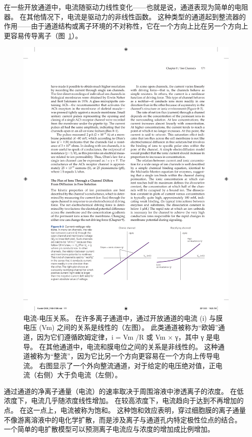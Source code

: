 在一些开放通道中，电流随驱动力线性变化——也就是说，通道表现为简单的电阻器。
在其他情况下，电流是驱动力的非线性函数。
这种类型的通道起到整流器的作用——由于通道结构或离子环境的不对称性，它在一个方向上比在另一个方向上更容易传导离子（图~\ref{fig:8_3}）。


\begin{figure}[htbp]
	\centering
	\includegraphics[width=1.0\linewidth]{chap08/fig_8_3}
	\caption{电流-电压关系。 在许多离子通道中，通过开放通道的电流 (i) 与膜电压 (Vm) 之间的关系是线性的（左图）。 此类通道被称为“欧姆”通道，因为它们遵循欧姆定律，i = Vm /R 或 Vm × γ，其中 γ 是电导。 在其他通道中，电流和膜电位之间的关系是非线性的。 这种通道被称为“整流”，因为它比另一个方向更容易在一个方向上传导电流。 右图显示了一个外向整流通道，对于给定的电压绝对值，正电流（右侧）大于负电流（左侧）。}
	\label{fig:8_3}
\end{figure}


通过通道的净离子通量（电流）的速率取决于周围溶液中渗透离子的浓度。
在低浓度下，电流几乎随浓度线性增加。
在较高浓度下，电流趋向于达到不再增加的点。
在这一点上，电流被称为饱和。
这种饱和效应表明，穿过细胞膜的离子通量不像游离溶液中的电化学扩散，而是涉及离子与通道孔内特定极性位点的结合。
一个简单的电扩散模型可以预测离子电流应与浓度的增加成比例增加。


